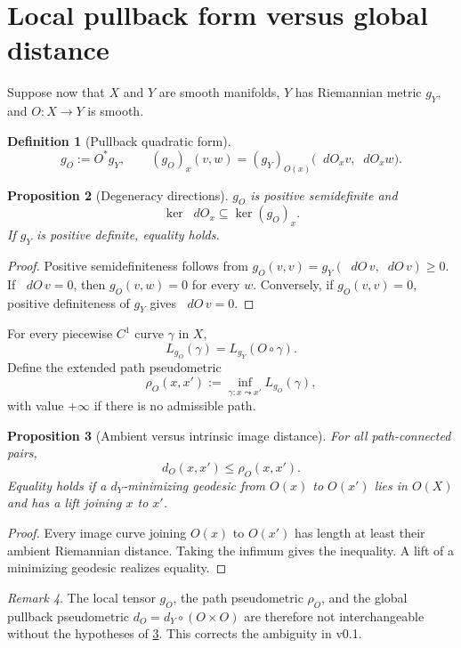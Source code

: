 \documentclass[11pt,a4paper]{article}
\theoremstyle{definition}
\newtheorem{definition}{Definition}[section]
\theoremstyle{plain}
\newtheorem{proposition}[definition]{Proposition}
\theoremstyle{remark}
\newtheorem{remark}[definition]{Remark}
\newcommand{\dd}{\mathop{}\!d}
\begin{document}
\section{Local pullback form versus global distance}

Suppose now that $X$ and $Y$ are smooth manifolds, $Y$ has Riemannian
metric $g_Y$, and $O:X\to Y$ is smooth.

\begin{definition}[Pullback quadratic form]
\[
 g_O:=O^*g_Y,\qquad
 (g_O)_x(v,w)=
 (g_Y)_{O(x)}\bigl(\dd O_xv,\dd O_xw\bigr).
\]
\end{definition}

\begin{proposition}[Degeneracy directions]
$g_O$ is positive semidefinite and
\[
 \ker \dd O_x\subseteq\ker(g_O)_x.
\]
If $g_Y$ is positive definite, equality holds.
\end{proposition}

\begin{proof}
Positive semidefiniteness follows from
$g_O(v,v)=g_Y(\dd O\,v,\dd O\,v)\geq0$. If $\dd O\,v=0$, then
$g_O(v,w)=0$ for every $w$. Conversely, if $g_O(v,v)=0$, positive
definiteness of $g_Y$ gives $\dd O\,v=0$.
\end{proof}

For every piecewise $C^1$ curve $\gamma$ in $X$,
\[
 L_{g_O}(\gamma)=L_{g_Y}(O\circ\gamma).
\]
Define the extended path pseudometric
\[
 \rho_O(x,x')
 :=
 \inf_{\gamma:x\leadsto x'}L_{g_O}(\gamma),
\]
with value $+\infty$ if there is no admissible path.

\begin{proposition}[Ambient versus intrinsic image distance]
\label{prop:path}
For all path-connected pairs,
\[
 d_O(x,x')\leq\rho_O(x,x').
\]
Equality holds if a $d_Y$-minimizing geodesic from $O(x)$ to $O(x')$
lies in $O(X)$ and has a lift joining $x$ to $x'$.
\end{proposition}

\begin{proof}
Every image curve joining $O(x)$ to $O(x')$ has length at least their
ambient Riemannian distance. Taking the infimum gives the inequality. A
lift of a minimizing geodesic realizes equality.
\end{proof}

\begin{remark}
The local tensor $g_O$, the path pseudometric $\rho_O$, and the global
pullback pseudometric $d_O=d_Y\circ(O\times O)$ are therefore not
interchangeable without the hypotheses of \cref{prop:path}. This corrects
the ambiguity in v0.1.
\end{remark}
\end{document}
